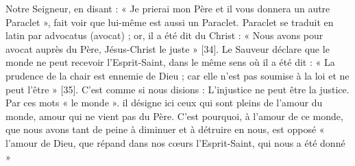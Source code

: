 Notre Seigneur, en disant : « Je prierai mon Père et il vous donnera un autre Paraclet », fait voir que lui-même est aussi un Paraclet. Paraclet se traduit en latin par advocatus (avocat) ; or, il a été dit du Christ : « Nous avons pour avocat auprès du Père, Jésus-Christ le juste » [34]. Le Sauveur déclare que le monde ne peut recevoir l’Esprit-Saint, dans le même sens où il a été dit : « La prudence de la chair est ennemie de Dieu ; car elle n’est pas soumise à la loi et ne peut l’être » [35]. C’est comme si nous disions : L’injustice ne peut être la justice. Par ces mots « le monde ». il désigne ici ceux qui sont pleins de l’amour du monde, amour qui ne vient pas du Père. C’est pourquoi, à l’amour de ce monde, que nous avons tant de peine à diminuer et à détruire en nous, est opposé « l’amour de Dieu, que répand dans nos cœurs l’Esprit-Saint, qui nous a été donné »